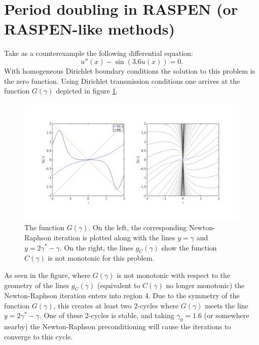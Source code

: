 \documentclass{article}
\begin{document}
\section{Period doubling in RASPEN (or RASPEN-like methods)}
\label{sec:period}

Take as a counterexample the following differential equation:
\begin{equation*}
u''(x) - \sin(3.6 u(x)) = 0 .
\end{equation*}
With homogeneous Dirichlet boundary conditions the solution to this problem is the zero function.
Using Dirichlet transmission conditions one arrives at the function $G(\gamma)$ depicted in figure \ref{fig:exsin}.

\begin{figure}
	\includegraphics[width=\textwidth]{exp9_02.png}
	\caption{The function $G(\gamma)$.
	On the left, the corresponding Newton-Raphson iteration is plotted along with the lines $y=\gamma$ and $y=2 \gamma^* - \gamma$.
	On the right, the lines $g_C(\gamma)$ show the function $C(\gamma)$ is not monotonic for this problem.}
	\label{fig:exsin}
\end{figure}

As seen in the figure, where $G(\gamma)$ is not monotonic with respect to the geometry of the lines $g_C(\gamma)$ (equivalent to $C(\gamma)$ no longer monotonic) the Newton-Raphson iteration enters into region 4.
Due to the symmetry of the function $G(\gamma)$, this creates at least two 2-cycles where $G(\gamma)$ meets the line $y = 2 \gamma^* - \gamma$.
One of these 2-cycles is stable, and taking $\gamma_0 = 1.6$ (or somewhere nearby) the Newton-Raphson preconditioning will cause the iterations to converge to this cycle.
\end{document}
